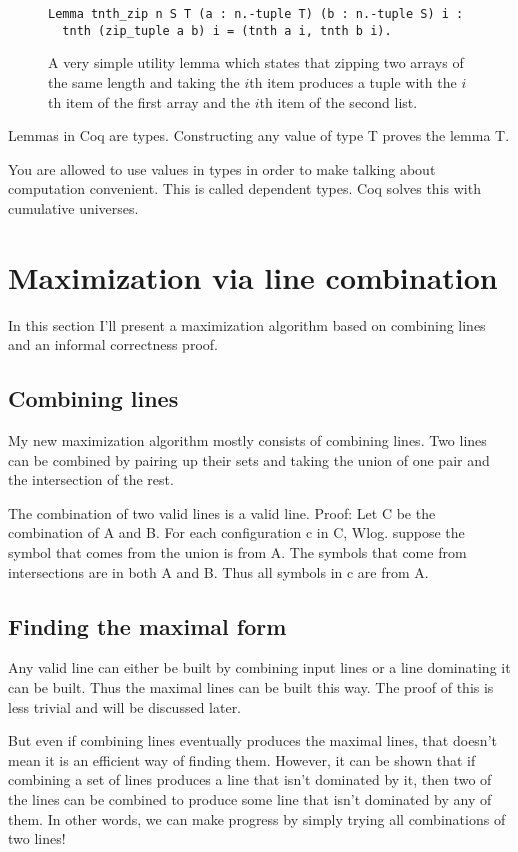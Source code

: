 \documentclass[english, 12pt, a4paper, sci, utf8, a-1b, online]{aaltothesis}
\begin{document}
\begin{figure}[h]
\begin{verbatim}
Lemma tnth_zip n S T (a : n.-tuple T) (b : n.-tuple S) i :
  tnth (zip_tuple a b) i = (tnth a i, tnth b i).
\end{verbatim}
\caption{A very simple utility lemma which states that zipping two arrays of the same length and taking the $i$th item produces a tuple with the $i$th item of the first array and the $i$th item of the second list.}
\end{figure}

Lemmas in Coq are types. Constructing any value of type T proves the lemma T.

You are allowed to use values in types in order to make talking about computation convenient. This is called dependent types. Coq solves this with cumulative universes.


\section{Maximization via line combination}

In this section I'll present a maximization algorithm based on combining lines and an informal correctness proof.

\subsection{Combining lines}

My new maximization algorithm mostly consists of combining lines. Two lines can be combined by pairing up their sets and taking the union of one pair and the intersection of the rest.

The combination of two valid lines is a valid line. Proof: Let C be the combination of A and B. For each configuration c in C, Wlog. suppose the symbol that comes from the union is from A. The symbols that come from intersections are in both A and B. Thus all symbols in c are from A.

\subsection{Finding the maximal form}

Any valid line can either be built by combining input lines or a line dominating it can be built. Thus the maximal lines can be built this way. The proof of this is less trivial and will be discussed later.

But even if combining lines eventually produces the maximal lines, that doesn't mean it is an efficient way of finding them. However, it can be shown that if combining a set of lines produces a line that isn't dominated by it, then two of the lines can be combined to produce some line that isn't dominated by any of them. In other words, we can make progress by simply trying all combinations of two lines!
\end{document}
